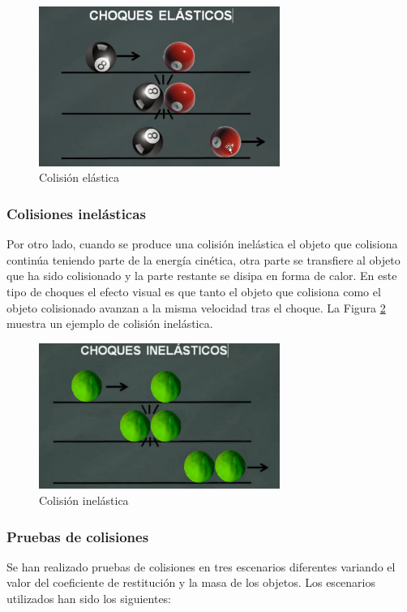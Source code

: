\begin{figure}[h!]
    \centering
    \includegraphics[width=0.7\textwidth, height=0.4\textwidth]{elastico.png}
    \caption{Colisión elástica\footnotemark}
    \label{fig:elastico}
\end{figure}


\subsubsection{Colisiones inelásticas}
Por otro lado, cuando se produce una colisión inelástica el objeto que colisiona continúa teniendo parte de la energía cinética, otra parte se transfiere al objeto que ha sido colisionado y la parte restante se disipa en forma de calor. En este tipo de choques el efecto visual es que tanto el objeto que colisiona como el objeto colisionado avanzan a la misma velocidad tras el choque. La Figura \ref{fig:inelastico} muestra un ejemplo de colisión inelástica.

\begin{figure}[h!]
    \centering
    \includegraphics[width=0.7\textwidth, height=0.4\textwidth]{colision_inelastica.jpg}
    \caption{Colisión inelástica\footnotemark}
    \label{fig:inelastico}
\end{figure}

\subsubsection{Pruebas de colisiones}
Se han realizado pruebas de colisiones en tres escenarios diferentes variando el valor del coeficiente de restitución y la masa de los objetos. Los escenarios utilizados han sido los siguientes:

